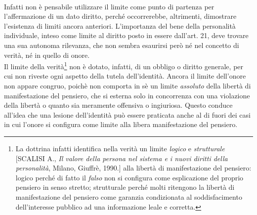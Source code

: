 \\Infatti non è pensabile utilizzare il limite come punto di partenza per l'affermazione di un dato diritto, perché occorrerebbe, altrimenti, dimostrare l'esistenza di limiti ancora anteriori. L'importanza del bene della personalità individuale, inteso come limite al diritto posto in essere dall'art. 21, deve trovare una sua autonoma rilevanza, che non sembra esaurirsi però né nel concetto di verità, né in quello di onore.\\Il limite della verità\footnote{La dottrina infatti identifica nella verità un limite \textit{logico} e \textit{strutturale} [SCALISI A., \textit{Il valore della persona nel sistema e i nuovi diritti della personalità}, Milano, Giuffrè, 1990.] alla libertà di manifestazione del pensiero: logico perché di fatto il \textit{falso} non si configura come esplicazione del proprio pensiero in senso stretto; strutturale perché molti ritengono la libertà di manifestazione del pensiero come garanzia condizionata al soddisfacimento dell'interesse pubblico ad una informazione leale e corretta.} non è dotato, infatti, di un obbligo o diritto generale, per cui non riveste ogni aspetto della tutela dell'identità. Ancora il limite dell'onore non appare congruo, poichè non comporta in sè un limite \textit{assoluto} della libertà di manifestazione del pensiero, che si esterna solo in concorrenza con una violazione della libertà o quanto sia meramente offensiva o ingiuriosa. Questo conduce all'idea che una lesione dell'identità può essere praticata anche al di fuori dei casi in cui  l'onore si configura come limite alla libera manifestazione del pensiero.
